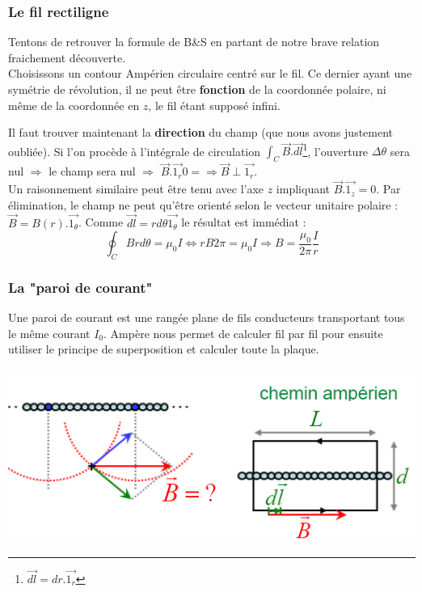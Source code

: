 \documentclass	[11pt, a4paper, openany]{book}
\begin{document}
\subsubsection{Le fil rectiligne}
Tentons de retrouver la formule de B\&S en partant de notre brave relation fraichement découverte.\\

Choisissons un contour Ampérien circulaire centré sur le fil. Ce dernier ayant une symétrie de révolution, il ne peut être \textbf{fonction} de la coordonnée polaire, ni même de la coordonnée en $z$, le fil étant supposé infini.


Il faut trouver maintenant la \textbf{direction} du champ (que nous avons justement oubliée). Si l'on procède à l'intégrale de circulation $\int_C \vec{B}.\vec{dl}$\footnote{$\vec{dl} = dr.\vec{1_r}$}, l'ouverture $\Delta\theta$ sera nul $\Rightarrow$ le champ sera nul $\Rightarrow$ $\vec{B}.\vec{1_r} 0 = \Rightarrow \vec{B} \perp \vec{1_r}$.\\


Un raisonnement similaire peut être tenu avec l'axe $z$ impliquant $\vec{B}.\vec{1_z} = 0$. Par élimination, le champ ne peut qu'être orienté selon le vecteur unitaire polaire : $\vec{B} = B(r).\vec{1_\theta}$. Comme $\vec{dl} = rd\theta\vec{1_\theta}$ le résultat est immédiat :
\begin{equation}
	\oint_C Brd\theta = \mu_0 I \Leftrightarrow rB2\pi = \mu_0 I \Rightarrow B = \frac{\mu_0}{2\pi}\frac{I}{r}
\end{equation}



\subsubsection{La "paroi de courant"}
Une paroi de courant est une rangée plane de fils conducteurs transportant tous le même courant $I_0$. Ampère nous permet de calculer fil par fil pour ensuite utiliser le principe de superposition et calculer toute la plaque.

\begin{center}
	\includegraphics[scale=0.55]{magneto/image7.png}
\end{center}
\end{document}
